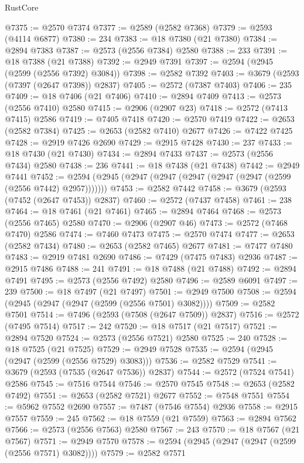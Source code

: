 \begin{lexlean}{RustCore}
\begin{coremodule}
@7375 := @2570 @7374
@7377 := @2589 (@2582 @7368)
@7379 := @2593 (@4114 @6877)
@7380 := 234
@7383 := @18 @7380 (@21 @7380)
@7384 := @2894 @7383
@7387 := @2573 (@2556 @7384) @2580
@7388 := 233
@7391 := @18 @7388 (@21 @7388)
@7392 := @2949 @7391
@7397 := @2594 (@2945 (@2599 (@2556 @7392) @3084))
@7398 := @2582 @7392
@7403 := @3679 (@2593 (@7397 (@2647 @7398)) @2837)
@7405 := @2572 (@7387 @7403)
@7406 := 235
@7409 := @18 @7406 (@21 @7406)
@7410 := @2894 @7409
@7413 := @2573 (@2556 @7410) @2580
@7415 := @2906 (@2907 @23)
@7418 := @2572 (@7413 @7415) @2586
@7419 := @7405 @7418
@7420 := @2570 @7419
@7422 := @2653 (@2582 @7384)
@7425 := @2653 (@2582 @7410) @2677
@7426 := @7422 @7425
@7428 := @2919 @7426 @2690
@7429 := @2915 @7428
@7430 := 237
@7433 := @18 @7430 (@21 @7430)
@7434 := @2894 @7433
@7437 := @2573 (@2556 @7434) @2580
@7438 := 236
@7441 := @18 @7438 (@21 @7438)
@7442 := @2949 @7441
@7452 := @2594 (@2945 (@2947 (@2947 (@2947 (@2947 (@2947 (@2599 (@2556 @7442) @2957)))))))
@7453 := @2582 @7442
@7458 := @3679 (@2593 (@7452 (@2647 @7453)) @2837)
@7460 := @2572 (@7437 @7458)
@7461 := 238
@7464 := @18 @7461 (@21 @7461)
@7465 := @2894 @7464
@7468 := @2573 (@2556 @7465) @2580
@7470 := @2906 (@2907 @46)
@7473 := @2572 (@7468 @7470) @2586
@7474 := @7460 @7473
@7475 := @2570 @7474
@7477 := @2653 (@2582 @7434)
@7480 := @2653 (@2582 @7465) @2677
@7481 := @7477 @7480
@7483 := @2919 @7481 @2690
@7486 := @7429 (@7475 @7483) @2936
@7487 := @2915 @7486
@7488 := 241
@7491 := @18 @7488 (@21 @7488)
@7492 := @2894 @7491
@7495 := @2573 (@2556 @7492) @2580
@7496 := @2589 @6091
@7497 := 239
@7500 := @18 @7497 (@21 @7497)
@7501 := @2949 @7500
@7508 := @2594 (@2945 (@2947 (@2947 (@2599 (@2556 @7501) @3082))))
@7509 := @2582 @7501
@7514 := @7496 (@2593 (@7508 (@2647 @7509)) @2837)
@7516 := @2572 (@7495 @7514)
@7517 := 242
@7520 := @18 @7517 (@21 @7517)
@7521 := @2894 @7520
@7524 := @2573 (@2556 @7521) @2580
@7525 := 240
@7528 := @18 @7525 (@21 @7525)
@7529 := @2949 @7528
@7535 := @2594 (@2945 (@2947 (@2599 (@2556 @7529) @3083)))
@7536 := @2582 @7529
@7541 := @3679 (@2593 (@7535 (@2647 @7536)) @2837)
@7544 := @2572 (@7524 @7541) @2586
@7545 := @7516 @7544
@7546 := @2570 @7545
@7548 := @2653 (@2582 @7492)
@7551 := @2653 (@2582 @7521) @2677
@7552 := @7548 @7551
@7554 := @5962 @7552 @2690
@7557 := @7487 (@7546 @7554) @2936
@7558 := @2915 @7557
@7559 := 245
@7562 := @18 @7559 (@21 @7559)
@7563 := @2894 @7562
@7566 := @2573 (@2556 @7563) @2580
@7567 := 243
@7570 := @18 @7567 (@21 @7567)
@7571 := @2949 @7570
@7578 := @2594 (@2945 (@2947 (@2947 (@2599 (@2556 @7571) @3082))))
@7579 := @2582 @7571

\end{coremodule}
\end{lexlean}
